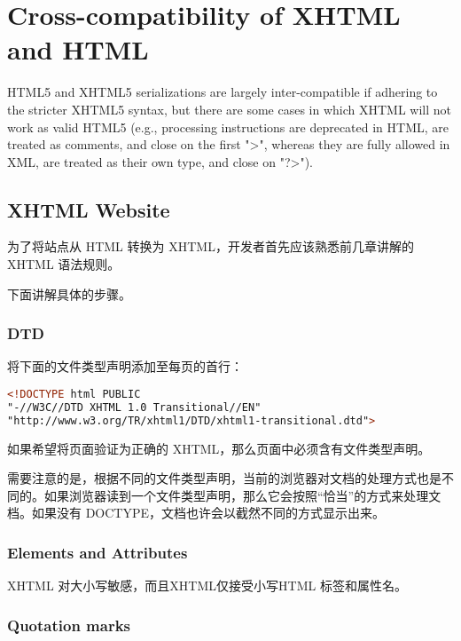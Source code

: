 \chapter{Cross-compatibility of XHTML and HTML}



HTML5 and XHTML5 serializations are largely inter-compatible if adhering to the stricter XHTML5 syntax, but there are some cases in which XHTML will not work as valid HTML5 (e.g., processing instructions are deprecated in HTML, are treated as comments, and close on the first ">", whereas they are fully allowed in XML, are treated as their own type, and close on "?>").

\section{XHTML Website}

为了将站点从 HTML 转换为 XHTML，开发者首先应该熟悉前几章讲解的 XHTML 语法规则。

下面讲解具体的步骤。

\subsection{DTD}

将下面的文件类型声明添加至每页的首行：

\begin{lstlisting}[language=HTML]
<!DOCTYPE html PUBLIC
"-//W3C//DTD XHTML 1.0 Transitional//EN"
"http://www.w3.org/TR/xhtml1/DTD/xhtml1-transitional.dtd">
\end{lstlisting}

如果希望将页面验证为正确的 XHTML，那么页面中必须含有文件类型声明。

需要注意的是，根据不同的文件类型声明，当前的浏览器对文档的处理方式也是不同的。如果浏览器读到一个文件类型声明，那么它会按照“恰当”的方式来处理文档。如果没有 DOCTYPE，文档也许会以截然不同的方式显示出来。



\subsection{Elements and Attributes}

XHTML 对大小写敏感，而且XHTML仅接受小写HTML 标签和属性名。


\subsection{Quotation marks}

